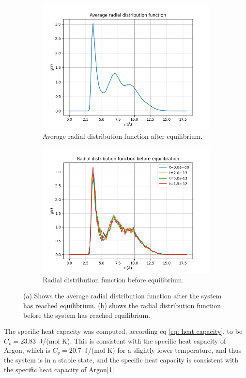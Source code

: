 \documentclass[a4paper]{article}
\begin{document}
\begin{figure}[H]
    \centering
    \begin{subfigure}[b]{0.45\textwidth}
        \centering
        \includegraphics[width=\textwidth]{average_radial.png}
        \caption{Average radial distribution function after equilibrium.}
        \label{fig: average radial}
    \end{subfigure}
    \hfill
    \begin{subfigure}[b]{0.45\textwidth}
        \centering
        \includegraphics[width=\textwidth]{radial_before.png}
        \caption{Radial distribution function before equilibrium.}
        \label{fig: before radial }
    \end{subfigure}
    \caption{(a) Shows the average radial distribution function after the system has reached equilibrium. (b) shows the radial distribution function before the system has reached equilibrium.}
    \label{fig: Radial tests}
\end{figure}\noindent
The specific heat capacity was computed, according eq \eqref{eq: heat capacity}, to be $C_v = 23.83$~J/(mol K).
This is consistent with the specific heat capacity of Argon, which is $C_v = 20.7$~J/(mol K) for a slightly lower temperature, and thus the system is in a stable state, and the specific heat capacity is consistent with the specific heat capacity of Argon[1].
\end{document}
